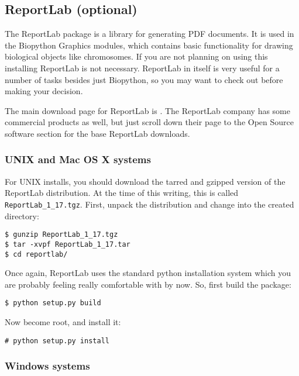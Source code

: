 \documentclass{article}
\begin{document}
\subsection{ReportLab (optional)}

The ReportLab package is a library for generating PDF documents. It is
used in the Biopython Graphics modules, which contains basic
functionality for drawing biological objects like chromosomes. If you
are not planning on using this installing ReportLab is not necessary.
ReportLab in itself is very useful for a number of tasks besides just
Biopython, so you may want to check out
 before making your decision.


The main download page for ReportLab is
. The ReportLab
company has some commercial products as well, but just scroll down their
page to the Open Source software section for the base ReportLab
downloads.

\subsubsection{UNIX and Mac OS X systems}

For UNIX installs, you should download the tarred and gzipped version of
the ReportLab distribution. At the time of this writing, this is called
\verb|ReportLab_1_17.tgz|. First, unpack the distribution and change
into the created directory:

\begin{verbatim}
$ gunzip ReportLab_1_17.tgz 
$ tar -xvpf ReportLab_1_17.tar
$ cd reportlab/
\end{verbatim}

Once again, ReportLab uses the standard python installation system which
you are probably feeling really comfortable with by now. So, first build
the package:

\begin{verbatim}
$ python setup.py build
\end{verbatim}

Now become root, and install it:

\begin{verbatim}
# python setup.py install
\end{verbatim}

\subsubsection{Windows systems}
\end{document}
